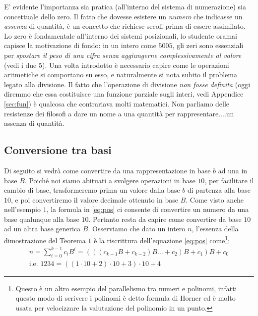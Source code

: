 {E' evidente l'importanza sia pratica (all'interno
del sistema di numerazione) sia concettuale dello zero. Il fatto che dovesse
esistere un \emph{numero} che indicasse un \emph{assenza} di quantità, è un
concetto che richiese secoli prima di essere assimilato. Lo zero è fondamentale
all'interno dei sistemi posizionali, lo studente oramai capisce la motivazione
di fondo: in un intero come $5005$, gli zeri sono essenziali per \emph{spostare
il peso di una cifra senza aggiungerne complessivamente al valore} (vedi i due
$5$). Una volta introdotto è necessario capire come le operazioni aritmetiche
si comportano su esso, e naturalmente si nota subito il problema legato alla
divisione. Il fatto che l'operazione di divisione \emph{non fosse definita}
(oggi diremmo che essa costituisce una funzione parziale sugli interi, vedi Appendice \ref{sec:fun}) è
qualcosa che contrariava molti matematici. Non parliamo delle resistenze dei
filosofi a dare un nome a una quantità per rappresentare....un assenza di
quantità.
}

\subsection{Conversione tra basi}\label{sec:conversione}

Di seguito si vedrà come convertire da una rappresentazione in base $b$ ad una
in base $B$. Poiché noi siamo abituati a svolgere operazioni in base $10$, per
facilitare il cambio di base, trasformeremo prima un valore dalla base $b$ di
partenza alla base $10$, e poi convertiremo il valore decimale ottenuto in base
$B$. Come visto anche nell'esempio $1$, la formula in \eqref{eq:pos} ci
consente di convertire un numero da una base qualunque alla base $10$. Pertanto
resta da capire come convertire da base $10$ ad un altra base generica $B$.
Osserviamo che dato un intero $n$, l'essenza della dimostrazione del Teorema
$1$ è la riscrittura dell'equazione \eqref{eq:pos} come\footnote{Questo è un
altro esempio del parallelismo tra numeri e polinomi, infatti questo modo di
scrivere i polinomi è detto formula di Horner ed è molto usata per velocizzare
la valutazione del polinomio in un punto.}:
\begin{align*}
n = \sum_{i=0}^{k-1} c_iB^i = (((c_{k-1}B+c_{k-2})B\ldots+ c_2)B + c_1)B + c_0\\
\text{i.e. } 1234 = ((1\cdot{10}+2)\cdot{10}+3)\cdot{10} + 4
\end{align*}

